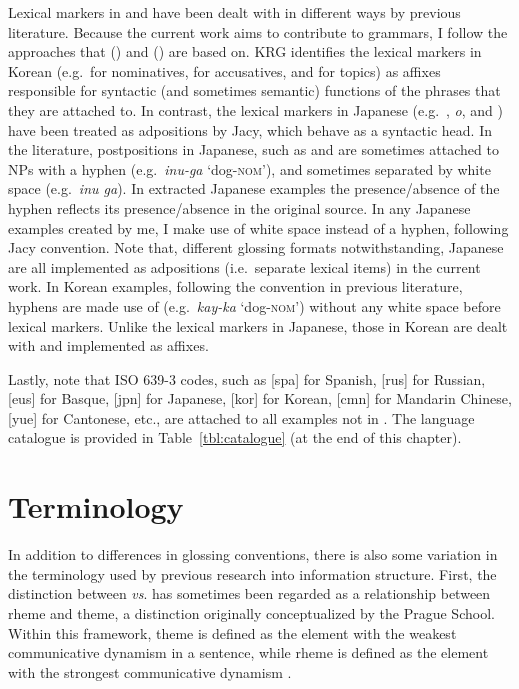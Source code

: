 Lexical markers in  and  have been dealt
with in different ways by previous literature. Because the current
work aims to contribute to  grammars, I follow the
approaches that  (\citealt{siegel:etal:16}) and 
(\citealt{kim:etal:11}) are based on.  KRG identifies the lexical
markers in Korean (e.g.\ \ika for nominatives, \lul for accusatives,
and \nun for topics) as affixes responsible for syntactic (and
sometimes semantic) functions of the phrases that they are attached
to. In contrast, the lexical markers in Japanese
(e.g.\ \ga, \textit{o}, and \wa) have been treated as adpositions by
Jacy, which behave as a syntactic head.  In the literature,
postpositions in Japanese, such as \ga and \wa are sometimes attached
to NPs with a hyphen (e.g.\ \textit{inu-ga} `dog-\textsc{nom}'), and
sometimes separated by white space (e.g.\ \textit{inu ga}).  In
extracted Japanese examples the presence/absence of the hyphen
reflects its presence/absence in the original source.  In any Japanese
examples created by me, I make use of white space instead of a hyphen,
following Jacy convention. Note that, different glossing formats
notwithstanding, Japanese  are all implemented as
adpositions (i.e.\ separate lexical items) in the current work.  In
Korean examples, following the convention in previous literature,
hyphens are made use of (e.g.\ \textit{kay-ka} `dog-\textsc{nom}')
without any white space before lexical markers. Unlike the lexical
markers in Japanese, those in Korean are dealt with and implemented as
affixes.



Lastly, note that ISO 639-3 codes, such as [spa] for Spanish, [rus]
for Russian, [eus] for Basque, [jpn] for Japanese, [kor] for Korean,
[cmn] for Mandarin Chinese, [yue] for Cantonese, etc., are attached to
all examples not in .  The language catalogue is provided
in Table~\ref{tbl:catalogue} (at the end of this chapter).



\section{Terminology}
\label{1:sec:terminology}

In addition to differences in glossing conventions, there is also some
variation in the terminology used by previous research into
information structure. First, the distinction between 
\textit{vs}.  has sometimes been regarded as a relationship
between rheme and theme, a distinction originally conceptualized by
the Prague School.  Within this framework, theme is defined as the
element with the weakest communicative dynamism in a sentence, while
rheme is defined as the element with the strongest communicative
dynamism \citep[72]{firbas:92}.



